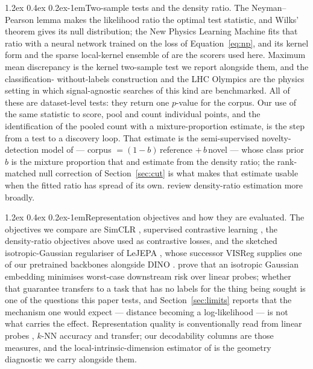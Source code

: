 \documentclass{article}
\makeatletter
\renewcommand\paragraph{\@startsection{paragraph}{4}{\z@}%
  {1.2ex \@plus 0.4ex \@minus 0.2ex}{-1em}{\normalsize\bf}}
\makeatother
\begin{document}
\paragraph{Two-sample tests and the density ratio.}
The Neyman--Pearson lemma \citep{neyman1933} makes the likelihood ratio the
optimal test statistic, and Wilks' theorem \citep{wilks1938} gives its null
distribution; the New Physics Learning Machine \citep{dagnolo2019nplm,
dagnolo2021multivariate} fits that ratio with a neural network trained on the
loss of Equation~\ref{eq:np}, and its kernel form \citep{letizia2022kernel}
and the sparse local-kernel ensemble of \citet{grosso2025sparker} are the
scorers used here. Maximum mean discrepancy \citep{gretton2012mmd} is the
kernel two-sample test we report alongside them, and the classification-
without-labels construction \citep{metodiev2017cwola} and the LHC Olympics
\citep{kasieczka2021lhco} are the physics setting in which
signal-agnostic searches of this kind are benchmarked. All of these are
dataset-level tests: they return one $p$-value for the corpus. Our use of
the same statistic to score, pool and count individual points, and the
identification of the pooled count with a mixture-proportion estimate, is
the step from a test to a discovery loop. That estimate is the
semi-supervised novelty-detection model of \citet{blanchard2010ssnd} ---
corpus $= (1-b)\,$reference $+\, b\,$novel --- whose class prior $b$ is the
mixture proportion that \citet{elkan2008pu} and \citet{ramaswamy2016mpe}
estimate from the density ratio; the rank-matched null correction of
Section~\ref{sec:cut} is what makes that estimate usable when the fitted
ratio has spread of its own. \citet{sugiyama2012dre} review density-ratio
estimation more broadly.

\paragraph{Representation objectives and how they are evaluated.}
The objectives we compare are SimCLR \citep{chen2020simclr}, supervised
contrastive learning \citep{khosla2020supcon}, the density-ratio objectives
above used as contrastive losses, and the sketched isotropic-Gaussian
regulariser of LeJEPA \citep{balestriero2025lejepa}, whose successor VISReg
\citep{wu2026visreg} supplies one of our pretrained backbones alongside
DINO \citep{caron2021dino}. \citet{balestriero2025lejepa} prove that an
isotropic Gaussian embedding minimises worst-case downstream risk over
linear probes; whether that guarantee transfers to a task that has no
labels for the thing being sought is one of the questions this paper tests,
and Section~\ref{sec:limits} reports that the mechanism one would expect ---
distance becoming a log-likelihood --- is not what carries the effect.
Representation quality is conventionally read from linear probes
\citep{alain2017probes}, $k$-NN accuracy and transfer; our decodability
columns are those measures, and the local-intrinsic-dimension estimator of
\citet{levina2005lid} is the geometry diagnostic we carry alongside them.
\end{document}

